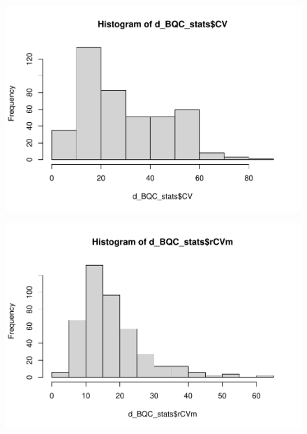 \documentclass[
  letterpaper,
  DIV=11,
  numbers=noendperiod]{scrreprt}
\newenvironment{Shaded}{\begin{snugshade}}{\end{snugshade}}
\newcommand{\FunctionTok}[1]{\textcolor[rgb]{0.28,0.35,0.67}{#1}}
\newcommand{\NormalTok}[1]{\textcolor[rgb]{0.00,0.23,0.31}{#1}}
\newcommand{\SpecialCharTok}[1]{\textcolor[rgb]{0.37,0.37,0.37}{#1}}
\begin{document}
\begin{Shaded}
\end{Shaded}

\begin{figure}[H]

{\centering \includegraphics{./datawrangling_files/figure-pdf/calulcate-column-stats-1.pdf}

}

\end{figure}

\begin{Shaded}
\end{Shaded}

\begin{figure}[H]

{\centering \includegraphics{./datawrangling_files/figure-pdf/calulcate-column-stats-2.pdf}

}

\end{figure}
\end{document}
